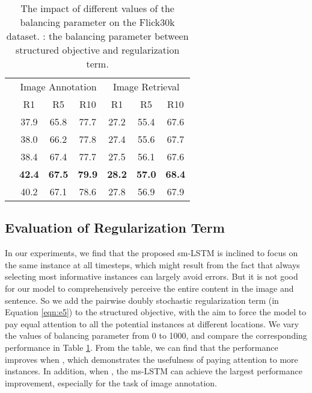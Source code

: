 \documentclass[10pt,twocolumn,letterpaper]{article}
\begin{document}
\begin{table}[t] \small
\addtolength{\tabcolsep}{-0.5pt}
\centering
\caption{The impact of different values of the balancing parameter on the Flick30k dataset.
: the balancing parameter between structured objective and regularization term.}
\begin{tabular}{l|ccc|ccc}
\hline
\hline
\multirow{2}{0.7cm}{}     &  \multicolumn{3}{c|}{Image Annotation}  &  \multicolumn{3}{c}{Image Retrieval}   \\
\cline{2-7}
     & R1 & R5  & R10   & R1 & R5  & R10  \\
\hline
\hspace{0mm}       &37.9 &65.8 &77.7 &27.2 &55.4 &67.6 \\
\hspace{0mm}       &38.0 &66.2 &77.8 &27.4 &55.6 &67.7  \\
\hspace{0mm}       &38.4 &67.4 &77.7 &27.5 &56.1 &67.6 \\
\hspace{0mm}       &\bf{42.4} &\bf{67.5} &\bf{79.9} &\bf{28.2} &\bf{57.0} &\bf{68.4} \\
\hspace{0mm}       &40.2 &67.1 &78.6 &27.8 &56.9 &67.9 \\

\hline
\hline
\end{tabular}
\label{table:R}
\end{table}




\subsection{Evaluation of Regularization Term}
In our experiments, we find that the proposed sm-LSTM
is inclined to focus on the same instance at all timesteps,
which might result from the fact that always selecting most informative
instances can largely avoid errors.
But it is not good for our model to comprehensively perceive the entire content
in the image and sentence.
So we add the pairwise doubly stochastic regularization term (in Equation \ref{eqn:e5})
to the structured objective,
with the aim to force the model to pay equal attention to all the potential instances at different locations.
We vary the values of balancing parameter  from 0 to 1000,
and compare the corresponding performance in Table \ref{table:R}.
From the table, we can find that the performance improves when ,
which demonstrates the usefulness of paying attention to more instances.
In addition, when , the ms-LSTM can achieve the largest performance improvement,
especially for the task of image annotation.
\end{document}
